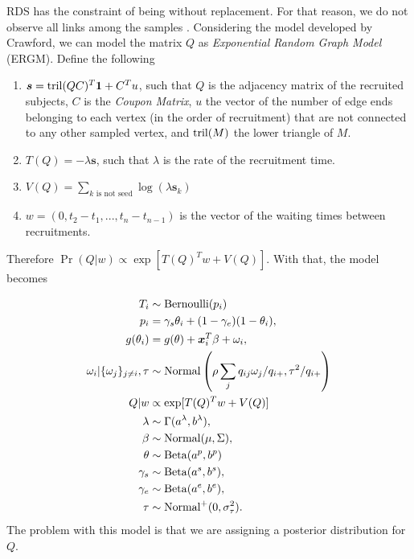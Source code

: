 RDS has the constraint of being without replacement. For that reason, we do
not observe all links among the samples \cite[]{crawford2016}. Considering the
model developed by Crawford, we can model the
matrix $Q$ as {\em Exponential Random Graph Model} (ERGM). Define the
following 

\begin{enumerate}
  \item $\boldsymbol{s} = \operatorname{tril}(QC)^T \boldsymbol{1} + C^Tu$, such that $Q$ is the
  adjacency matrix of the recruited subjects, $C$ is the {\em Coupon Matrix},
  $u$ the vector of the number of edge ends belonging to each vertex
  (in the order of recruitment) that are not connected to any other sampled
  vertex, and $\operatorname{tril}(M)$ the lower triangle of $M$. 

  \item $T(Q) = -\lambda \boldsymbol{s}$, such that $\lambda$ is the rate of
  the recruitment time. 

  \item $V(Q) = \sum_{k \text{ is not seed}} \log(\lambda \boldsymbol{s}_k)$
  
  \item $w = (0, t_2 - t_1, ..., t_n - t_{n-1})$ is the vector of the waiting times between
  recruitments.  
\end{enumerate}

Therefore $\Pr(Q|w) \propto \exp[T(Q)^Tw + V(Q)]$. With that, the model
becomes 

\begin{equation}
  \begin{aligned}
    T_i &\sim \operatorname{Bernoulli}(p_i) \\
    p_i &= \gamma_s\theta_i + (1-\gamma_e)(1 - \theta_i),  \\
    g(\theta_i) &= g(\theta) + \boldsymbol{x}_i^T\beta + \omega_i,  \\
    \omega_i|\{\omega_j\}_{j\neq i}, \tau &\sim \operatorname{Normal}\left(\rho\sum_j q_{ij}\omega_j/q_{i+}, \tau^2/q_{i+}\right) \\
    Q|w &\propto \exp[T(Q)^Tw + V(Q)] \\
    \lambda &\sim \Gamma(a^{\lambda}, b^{\lambda}), \\ 
    \beta &\sim \operatorname{Normal}(\mu, \Sigma), \\ 
    \theta &\sim \operatorname{Beta}(a^p, b^p) \\
    \gamma_s &\sim \operatorname{Beta}(a^s, b^s), \\
    \gamma_e &\sim \operatorname{Beta}(a^e, b^e), \\  
    \tau &\sim \operatorname{Normal}^+(0,\sigma^2_{\tau}).
  \end{aligned}  
\end{equation}
The problem with this model is that we are assigning a posterior distribution
for $Q$.